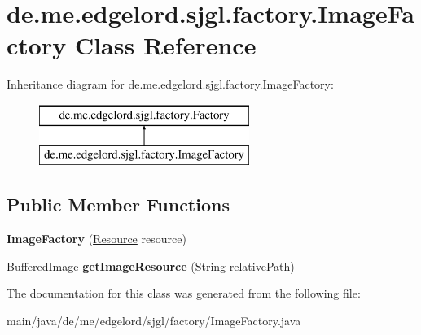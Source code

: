 \hypertarget{classde_1_1me_1_1edgelord_1_1sjgl_1_1factory_1_1_image_factory}{}\section{de.\+me.\+edgelord.\+sjgl.\+factory.\+Image\+Factory Class Reference}
\label{classde_1_1me_1_1edgelord_1_1sjgl_1_1factory_1_1_image_factory}
Inheritance diagram for de.\+me.\+edgelord.\+sjgl.\+factory.\+Image\+Factory\+:\begin{figure}[H]
\begin{center}
\leavevmode
\includegraphics[height=2.000000cm]{classde_1_1me_1_1edgelord_1_1sjgl_1_1factory_1_1_image_factory}
\end{center}
\end{figure}
\subsection*{Public Member Functions}
\begin{DoxyCompactItemize}
\item 
\mbox{\label{classde_1_1me_1_1edgelord_1_1sjgl_1_1factory_1_1_image_factory_a338a0b500d324df0b846fc37ab62a086}} 
{\bfseries Image\+Factory} (\mbox{\hyperlink{interfacede_1_1me_1_1edgelord_1_1sjgl_1_1resource_1_1_resource}{Resource}} resource)
\item 
\mbox{\label{classde_1_1me_1_1edgelord_1_1sjgl_1_1factory_1_1_image_factory_a52d6387a2a1e5eed2d9460b8c10b5311}} 
Buffered\+Image {\bfseries get\+Image\+Resource} (String relative\+Path)
\end{DoxyCompactItemize}


The documentation for this class was generated from the following file\+:\begin{DoxyCompactItemize}
\item 
main/java/de/me/edgelord/sjgl/factory/Image\+Factory.\+java\end{DoxyCompactItemize}
